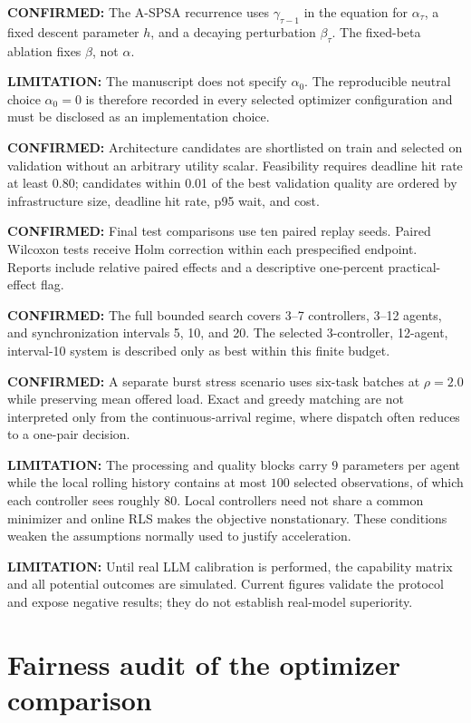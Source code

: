 \documentclass[11pt]{article}
\newcommand{\Confirmed}[1]{\par\noindent\textcolor{confirmed}{\textbf{CONFIRMED:} #1}\par}
\newcommand{\Warning}[1]{\par\noindent\textcolor{warning}{\textbf{LIMITATION:} #1}\par}
\begin{document}
\Confirmed{The A-SPSA recurrence uses $\gamma_{\tau-1}$ in the equation for
$\alpha_\tau$, a fixed descent parameter $h$, and a decaying perturbation
$\beta_\tau$. The fixed-beta ablation fixes $\beta$, not $\alpha$.}

\Warning{The manuscript does not specify $\alpha_0$. The reproducible neutral
choice $\alpha_0=0$ is therefore recorded in every selected optimizer
configuration and must be disclosed as an implementation choice.}

\Confirmed{Architecture candidates are shortlisted on train and selected on
validation without an arbitrary utility scalar. Feasibility requires deadline
hit rate at least 0.80; candidates within 0.01 of the best validation quality
are ordered by infrastructure size, deadline hit rate, p95 wait, and cost.}

\Confirmed{Final test comparisons use ten paired replay seeds. Paired
Wilcoxon tests receive Holm correction within each prespecified endpoint.
Reports include relative paired effects and a descriptive one-percent
practical-effect flag.}

\Confirmed{The full bounded search covers 3--7 controllers, 3--12 agents, and
synchronization intervals 5, 10, and 20. The selected 3-controller, 12-agent,
interval-10 system is described only as best within this finite budget.}

\Confirmed{A separate burst stress scenario uses six-task batches at
$\rho=2.0$ while preserving mean offered load. Exact and greedy matching are
not interpreted only from the continuous-arrival regime, where dispatch often
reduces to a one-pair decision.}

\Warning{The processing and quality blocks carry $9$ parameters per agent
while the local rolling history contains at most $100$ selected observations,
of which each controller sees roughly $80$. Local controllers need not share a
common minimizer and online RLS makes the objective nonstationary. These
conditions weaken the assumptions normally used to justify acceleration.}

\Warning{Until real LLM calibration is performed, the capability matrix and
all potential outcomes are simulated. Current figures validate the protocol
and expose negative results; they do not establish real-model superiority.}

\section{Fairness audit of the optimizer comparison}
\end{document}
